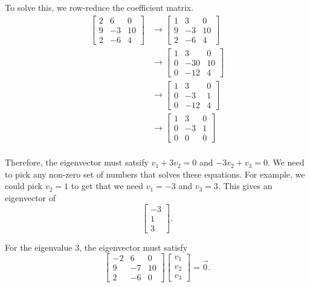 \begin{exampleSol}
To solve this, we row-reduce the coefficient matrix.
\[ \begin{split}
\begin{bmatrix} 2 & 6 & 0 \\ 9 & -3 & 10 \\ 2 & -6 & 4 \end{bmatrix} &\rightarrow \begin{bmatrix} 1 & 3 & 0 \\ 9 & -3 & 10 \\ 2 & -6 & 4 \end{bmatrix} \\
&\rightarrow  \begin{bmatrix} 1 & 3 & 0 \\ 0 & -30 & 10 \\ 0 & -12 & 4 \end{bmatrix} \\
&\rightarrow  \begin{bmatrix} 1 & 3 & 0 \\ 0 & -3 & 1 \\ 0 & -12 & 4 \end{bmatrix} \\
&\rightarrow  \begin{bmatrix} 1 & 3 & 0 \\ 0 & -3 & 1 \\ 0 & 0 & 0 \end{bmatrix} \\
\end{split}
\]

Therefore, the eigenvector must satsify $v_1 + 3v_2 = 0$ and $-3v_2 + v_3 = 0$. We need to pick any non-zero set of numbers that solves these equations. For example, we could pick $v_2 = 1$ to get that we need $v_1 = -3$ and $v_3 = 3$. This gives an eigenvector of \[ \begin{bmatrix} -3 \\ 1 \\ 3 \end{bmatrix}. \]

For the eigenvalue $3$, the eigenvector must satisfy
\[ \begin{bmatrix} -2 & 6 & 0 \\ 9 & -7 & 10 \\ 2 & -6 & 0 \end{bmatrix} \begin{bmatrix} v_1 \\ v_2 \\ v_3 \end{bmatrix} = \vec{0}. \]


\end{exampleSol}
